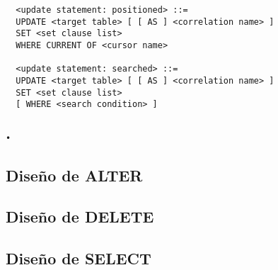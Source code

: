 \begin{Verbatim}
  <update statement: positioned> ::=
  UPDATE <target table> [ [ AS ] <correlation name> ]
  SET <set clause list>
  WHERE CURRENT OF <cursor name>
  
  <update statement: searched> ::=
  UPDATE <target table> [ [ AS ] <correlation name> ]
  SET <set clause list>
  [ WHERE <search condition> ]


\end{Verbatim}

\begin{Verbatim}
•
\end{Verbatim}

\subsection{Diseño de ALTER}

\subsection{Diseño de DELETE}

\subsection{Diseño de SELECT}
